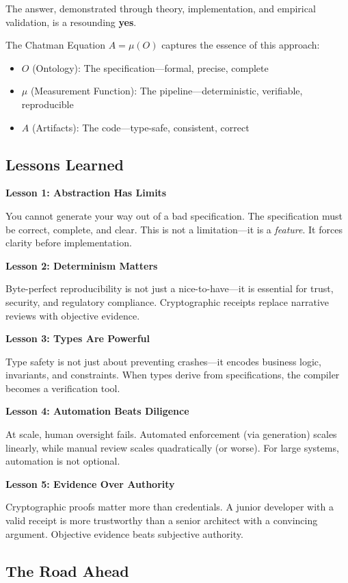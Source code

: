 The answer, demonstrated through theory, implementation, and empirical validation, is a resounding \textbf{yes}.

The Chatman Equation $A = \mu(O)$ captures the essence of this approach:
\begin{itemize}
    \item $O$ (Ontology): The specification—formal, precise, complete
    \item $\mu$ (Measurement Function): The pipeline—deterministic, verifiable, reproducible
    \item $A$ (Artifacts): The code—type-safe, consistent, correct
\end{itemize}

\subsection{Lessons Learned}

\textbf{Lesson 1: Abstraction Has Limits}

You cannot generate your way out of a bad specification. The specification must be correct, complete, and clear. This is not a limitation—it is a \textit{feature}. It forces clarity before implementation.

\textbf{Lesson 2: Determinism Matters}

Byte-perfect reproducibility is not just a nice-to-have—it is essential for trust, security, and regulatory compliance. Cryptographic receipts replace narrative reviews with objective evidence.

\textbf{Lesson 3: Types Are Powerful}

Type safety is not just about preventing crashes—it encodes business logic, invariants, and constraints. When types derive from specifications, the compiler becomes a verification tool.

\textbf{Lesson 4: Automation Beats Diligence}

At scale, human oversight fails. Automated enforcement (via generation) scales linearly, while manual review scales quadratically (or worse). For large systems, automation is not optional.

\textbf{Lesson 5: Evidence Over Authority}

Cryptographic proofs matter more than credentials. A junior developer with a valid receipt is more trustworthy than a senior architect with a convincing argument. Objective evidence beats subjective authority.

\subsection{The Road Ahead}

